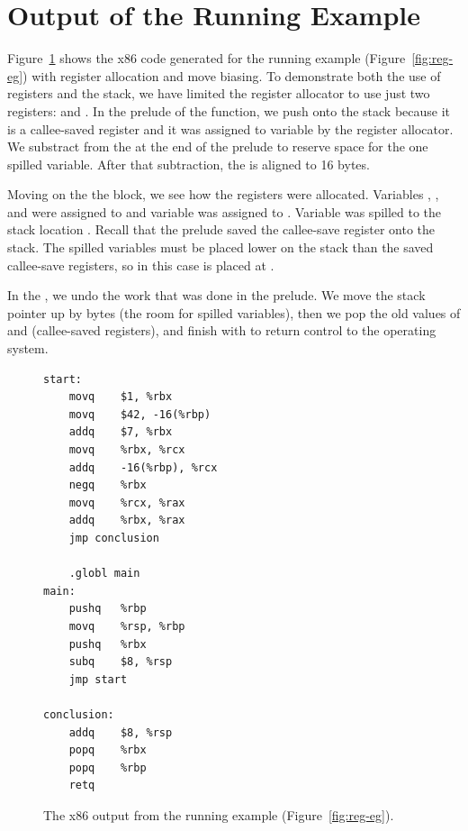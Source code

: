 \documentclass[11pt]{book}
\begin{document}
\section{Output of the Running Example}
\label{sec:reg-alloc-output}

Figure~\ref{fig:running-example-x86} shows the x86 code generated for
the running example (Figure~\ref{fig:reg-eg}) with register allocation
and move biasing. To demonstrate both the use of registers and the
stack, we have limited the register allocator to use just two
registers:  and .  In the prelude of the
 function, we push  onto the stack because it is
a callee-saved register and it was assigned to variable by the
register allocator.  We substract  from the  at the
end of the prelude to reserve space for the one spilled variable.
After that subtraction, the  is aligned to 16 bytes.

Moving on the the  block, we see how the registers were
allocated. Variables , , and  were assigned to
 and variable  was assigned to .  Variable
 was spilled to the stack location .  Recall
that the prelude saved the callee-save register  onto the
stack. The spilled variables must be placed lower on the stack than
the saved callee-save registers, so in this case  is placed at
.

In the , we undo the work that was done in the
prelude. We move the stack pointer up by  bytes (the room for
spilled variables), then we pop the old values of  and
 (callee-saved registers), and finish with  to
return control to the operating system.

  
\begin{figure}[tbp]
\begin{lstlisting}
start:
	movq	$1, %rbx
	movq	$42, -16(%rbp)
	addq	$7, %rbx
	movq	%rbx, %rcx
	addq	-16(%rbp), %rcx
	negq	%rbx
	movq	%rcx, %rax
	addq	%rbx, %rax
	jmp conclusion

	.globl main
main:
	pushq	%rbp
	movq	%rsp, %rbp
	pushq	%rbx
	subq	$8, %rsp
	jmp start
        
conclusion:
	addq	$8, %rsp
	popq	%rbx
	popq	%rbp
	retq
\end{lstlisting}
\caption{The x86 output from the running example (Figure~\ref{fig:reg-eg}).}
\label{fig:running-example-x86}
\end{figure}
\end{document}
